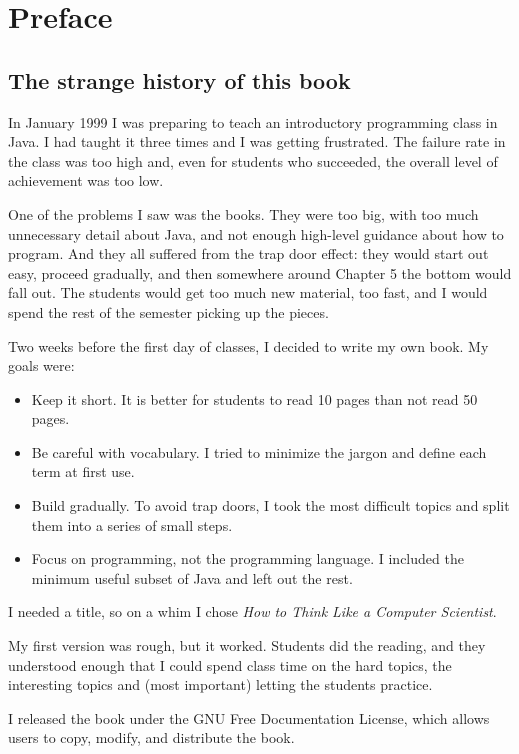 \chapter{Preface}

\section{The strange history of this book}

In January 1999 I was preparing to teach an introductory programming class in
Java. I had taught it three times and I was getting frustrated. The failure rate
in the class was too high and, even for students who succeeded, the overall
level of achievement was too low.

One of the problems I saw was the books. They were too big, with too much
unnecessary detail about Java, and not enough high-level guidance about how to
program. And they all suffered from the trap door effect: they would start out
easy, proceed gradually, and then somewhere around Chapter 5 the bottom would
fall out. The students would get too much new material, too fast, and I would
spend the rest of the semester picking up the pieces.

Two weeks before the first day of classes, I decided to write my own book. My
goals were:

\begin{itemize}
 \item Keep it short. It is better for students to read 10 pages than not read
 50 pages.
 \item Be careful with vocabulary.
I tried to minimize the jargon and define each term at first use.
 \item Build gradually.
To avoid trap doors, I took the most difficult topics and split them into a
series of small steps.
 \item Focus on programming, not the programming language. I included the
 minimum
useful subset of Java and left out the rest.
\end{itemize}

I needed a title, so on a whim I chose \emph{How to Think Like a Computer
Scientist}.

My first version was rough, but it worked. Students did the reading, and they
understood enough that I could spend class time on the hard topics, the
interesting topics and (most important) letting the students practice.

I released the book under the GNU Free Documentation License, which allows users
to copy, modify, and distribute the book.

